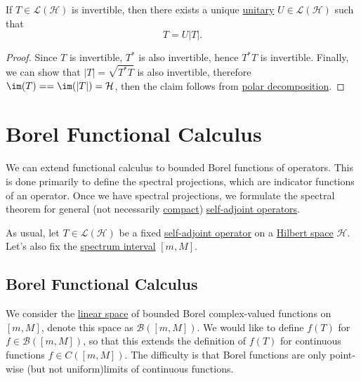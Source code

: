 \begin{theorem}\label{thm:polar-decomposition-for-invertible-op}
	If \(T\in \mathcal{L} (\mathcal{H} )\) is invertible, then there exists a unique \hyperref[def:unitary-op]{unitary} \(U\in \mathcal{L} (\mathcal{H} )\) such that
	\[
		T = U \vert T \vert .
	\]
\end{theorem}
\begin{proof}
	Since \(T\) is invertible, \(T^{\ast} \) is also invertible, hence \(T^{\ast} T\) is invertible. Finally, we can show that \(\vert T \vert = \sqrt{T^{\ast} T} \) is also invertible, therefore \(\im(T) = = \im(\vert T \vert ) = \mathcal{H}\), then the claim follows from \hyperref[thm:polar-decomposition]{polar decomposition}.
\end{proof}

\section{Borel Functional Calculus}
We can extend functional calculus to bounded Borel functions of operators. This is done primarily to define the spectral projections, which are indicator functions of an operator. Once we have spectral projections, we formulate the spectral theorem for general (not necessarily \hyperref[def:compact-op]{compact}) \hyperref[def:self-adjoint-op]{self-adjoint operators}.

As usual, let \(T\in \mathcal{L} (\mathcal{H} )\) be a fixed \hyperref[def:self-adjoint-op]{self-adjoint operator} on a \hyperref[def:Hilbert-space]{Hilbert space} \(\mathcal{H} \). Let's also fix the \hyperref[thm:spectrum-interval-2]{spectrum interval} \([m, M]\).

\subsection{Borel Functional Calculus}
We consider the \hyperref[def:linear-vector-space]{linear space} of bounded Borel complex-valued functions on \([m, M]\), denote this space as \(\mathcal{B} ([m, M])\). We would like to define \(f(T)\) for \(f\in \mathcal{B} ([m, M])\), so that this extends the definition of \(f(T)\) for continuous functions \(f\in C([m, M])\). The difficulty is that Borel functions are only point-wise (but not uniform)limits of continuous functions.

